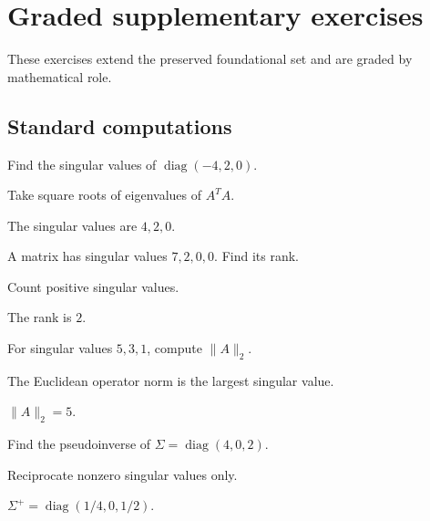 \section{Graded supplementary exercises}
These exercises extend the preserved foundational set and are graded by mathematical role.

\subsection*{Standard computations}

\begin{exercise}\label{exr:i18-expand-01}
Find the singular values of \(\operatorname{diag}(-4,2,0)\).
\end{exercise}
\begin{hint}
Take square roots of eigenvalues of \(A^TA\).
\end{hint}
\begin{solution}
The singular values are \(4,2,0\).
\end{solution}

\begin{exercise}\label{exr:i18-expand-02}
A matrix has singular values \(7,2,0,0\). Find its rank.
\end{exercise}
\begin{hint}
Count positive singular values.
\end{hint}
\begin{solution}
The rank is \(2\).
\end{solution}

\begin{exercise}\label{exr:i18-expand-03}
For singular values \(5,3,1\), compute \(\|A\|_2\).
\end{exercise}
\begin{hint}
The Euclidean operator norm is the largest singular value.
\end{hint}
\begin{solution}
\(\|A\|_2=5\).
\end{solution}

\begin{exercise}\label{exr:i18-expand-04}
Find the pseudoinverse of \(\Sigma=\operatorname{diag}(4,0,2)\).
\end{exercise}
\begin{hint}
Reciprocate nonzero singular values only.
\end{hint}
\begin{solution}
\(\Sigma^+=\operatorname{diag}(1/4,0,1/2)\).
\end{solution}

